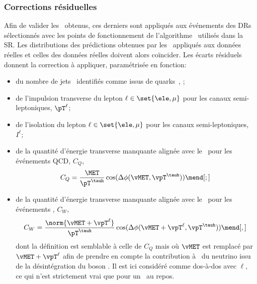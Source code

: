 \subsubsection{Corrections résiduelles}
Afin de valider les \fakefactors\ obtenus,
ces derniers sont appliqués aux événements des DRs
sélectionnés avec les points de fonctionnement de l'algorithme \DEEPTAU\
utilisés dans la SR.
Les distributions
des prédictions obtenues par les \fakefactors\ appliqués aux données réelles
et
celles des données réelles
doivent alors coïncider.
Les écarts résiduels donnent la correction à appliquer, paramétrisée en fonction:
\begin{itemize}
\item du nombre de jets \Nprebjets\ identifiés comme issus de quarks~\quarkb, \Nbjets;
\item de l'impulsion transverse du lepton $\ell\in\set{\ele,\mu}$ pour les canaux semi-leptoniques, $\pT^{\ell}$;
\item de l'isolation du lepton $\ell\in\set{\ele,\mu}$ pour les canaux semi-leptoniques, $I^{\ell}$;
\item de la quantité d'énergie transverse manquante alignée avec le \tauh\ pour les événements QCD, $C_Q$,
\begin{equation}
C_Q = \frac{\MET}{\pT^{\tauh}} \cos(\Delta\phi(\vMET, \vpT^{\tauh}))
\mend[;]
\label{eq-FF_CQ_def}
\end{equation}
\item de la quantité d'énergie transverse manquante alignée avec le \tauh\ pour les événements \Wjets, $C_W$,
\begin{equation}
C_W = \frac{\norm{\vMET + \vpT^{\ell}}}{\pT^{\tauh}} \cos(\Delta\phi(\vMET + \vpT^{\ell}, \vpT^{\tauh}))
\mend[,]
\label{eq-FF_CW_def}
\end{equation}
dont la définition est semblable à celle de $C_Q$ mais où $\vMET$ est remplacé par $\vMET + \vpT^{\ell}$ afin de prendre en compte la contribution à \MET\ du neutrino issu de la désintégration du boson \Wboson.
Il est ici considéré comme dos-à-dos avec $\ell$, ce qui n'est strictement vrai que pour un \Wboson\ au repos.
\end{itemize}
